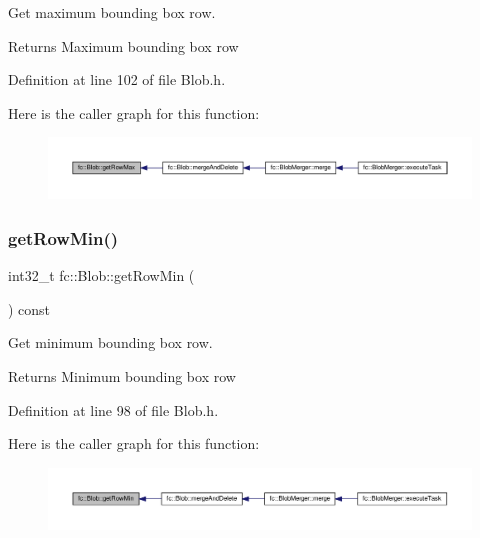 Get maximum bounding box row. 

\begin{DoxyReturn}{Returns}
Maximum bounding box row 
\end{DoxyReturn}


Definition at line 102 of file Blob.\+h.

Here is the caller graph for this function\+:
\nopagebreak
\begin{figure}[H]
\begin{center}
\leavevmode
\includegraphics[width=350pt]{d2/d7e/classfc_1_1Blob_af4a030b9ba08fd02242137a296a3692b_icgraph}
\end{center}
\end{figure}
\mbox{\label{classfc_1_1Blob_a167b6c3a33f301a7dcb527b289dd0834}} 
\subsubsection{\texorpdfstring{get\+Row\+Min()}{getRowMin()}}
{\footnotesize\ttfamily int32\+\_\+t fc\+::\+Blob\+::get\+Row\+Min (\begin{DoxyParamCaption}{ }\end{DoxyParamCaption}) const\hspace{0.3cm}{\ttfamily [inline]}}



Get minimum bounding box row. 

\begin{DoxyReturn}{Returns}
Minimum bounding box row 
\end{DoxyReturn}


Definition at line 98 of file Blob.\+h.

Here is the caller graph for this function\+:
\nopagebreak
\begin{figure}[H]
\begin{center}
\leavevmode
\includegraphics[width=350pt]{d2/d7e/classfc_1_1Blob_a167b6c3a33f301a7dcb527b289dd0834_icgraph}
\end{center}
\end{figure}
\mbox{\label{classfc_1_1Blob_aeb84112e584a5e918530690b42cfd8f6}} 
